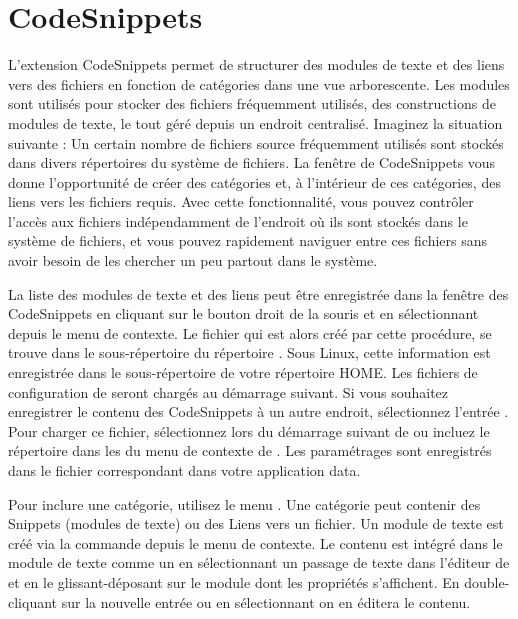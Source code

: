 \section{CodeSnippets}\label{sec:codesnippets}

L'extension CodeSnippets permet de structurer des modules de texte et des liens vers des fichiers en fonction de catégories dans une vue arborescente. Les modules sont utilisés pour stocker des fichiers fréquemment utilisés, des constructions de modules de texte, le tout géré depuis un endroit centralisé. Imaginez la situation suivante : Un certain nombre de fichiers source fréquemment utilisés sont stockés dans divers répertoires du système de fichiers. La fenêtre de CodeSnippets vous donne l'opportunité de créer des catégories et, à l'intérieur de ces catégories, des liens vers les fichiers requis. Avec cette fonctionnalité, vous pouvez contrôler l'accès aux fichiers indépendamment de l'endroit où ils sont stockés dans le système de fichiers, et vous pouvez rapidement naviguer entre ces fichiers sans avoir besoin de les chercher un peu partout dans le système.


La liste des modules de texte et des liens peut être enregistrée dans la fenêtre des CodeSnippets en cliquant sur le bouton droit de la souris et en sélectionnant  depuis le menu de contexte. Le fichier  qui est alors créé par cette procédure, se trouve dans le sous-répertoire  du répertoire . Sous Linux, cette information est enregistrée dans le sous-répertoire  de votre répertoire HOME. Les fichiers de configuration de \codeblocks seront chargés au démarrage suivant. Si vous souhaitez enregistrer le contenu des CodeSnippets à un autre endroit, sélectionnez l'entrée . Pour charger ce fichier, sélectionnez  lors du démarrage suivant de \codeblocks ou incluez le répertoire dans les  du menu de contexte de . Les paramétrages sont enregistrés dans le fichier correspondant  dans votre application data.

Pour inclure une catégorie, utilisez le menu . Une catégorie peut contenir des  Snippets (modules de texte) ou des Liens vers un fichier. Un module de texte est créé via la commande  depuis le menu de contexte. Le contenu est intégré dans le module de texte comme un  en sélectionnant un passage de texte dans l'éditeur de \codeblocks et en le glissant-déposant sur le module dont les propriétés s'affichent. En double-cliquant sur la nouvelle entrée ou en sélectionnant   on en éditera le contenu.

